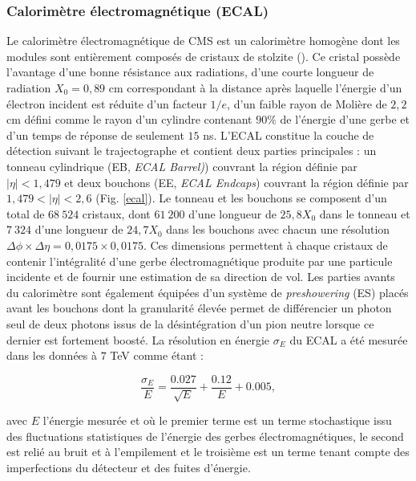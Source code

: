 \subsubsection{ Calorimètre électromagnétique (ECAL)}

Le calorimètre électromagnétique de CMS est un calorimètre homogène dont les modules sont entièrement composés de cristaux de stolzite (). Ce cristal possède l'avantage d'une bonne résistance aux radiations, d'une courte longueur de radiation $X_0=0,89$ cm correspondant à la distance après laquelle l'énergie d'un électron incident est réduite d'un facteur $1/e$, d'un faible rayon de Molière de $2,2$ cm défini comme le rayon d'un cylindre contenant $90\%$ de l'énergie d'une gerbe et d'un temps de réponse de seulement $15$ ns. L'ECAL constitue la couche de détection suivant le trajectographe et contient deux parties principales : un tonneau cylindrique (EB, \textit{ECAL Barrel)}) couvrant la région définie par $|\eta|<1,479$ et deux bouchons (EE, \textit{ECAL Endcaps}) couvrant la région définie par $1,479<|\eta|<2,6$ (Fig. \ref{ecal}). Le tonneau et les bouchons se composent d'un total de $68~524$ cristaux, dont $61~200$ d'une longueur de $25,8X_0$ dans le tonneau et $7~324$ d'une longueur de $24,7X_0$ dans les bouchons avec chacun une résolution $\Delta\phi\times\Delta\eta=0,0175\times0,0175$. Ces dimensions permettent à chaque cristaux de contenir l'intégralité d'une gerbe électromagnétique produite par une particule incidente et de fournir une estimation de sa direction de vol. Les parties avants du calorimètre sont également équipées d'un système de \textit{preshowering} (ES) placés avant les bouchons dont la granularité élevée permet de différencier un photon seul de deux photons issus de la désintégration d'un pion neutre lorsque ce dernier est fortement boosté. La résolution en énergie $\sigma_E$ du ECAL a été mesurée dans les données à $7$ TeV \cite{ECALres} comme étant :

\begin{equation}
    \frac{\sigma_E}{E}=\frac{0.027}{\sqrt{E}}+\frac{0.12}{E}+0.005,
\end{equation}

avec $E$ l'énergie mesurée et où le premier terme est un terme stochastique issu des fluctuations statistiques de l'énergie des gerbes électromagnétiques, le second est relié au bruit et à l'empilement et le troisième est un terme tenant compte des imperfections du détecteur et des fuites d'énergie.

